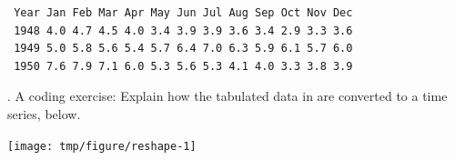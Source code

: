 \begin{frame}[fragile]
\vspace{-3mm}

\begin{knitrout}\small
{}\color{fgcolor}\begin{kframe}
\begin{verbatim}
 Year Jan Feb Mar Apr May Jun Jul Aug Sep Oct Nov Dec
 1948 4.0 4.7 4.5 4.0 3.4 3.9 3.9 3.6 3.4 2.9 3.3 3.6
 1949 5.0 5.8 5.6 5.4 5.7 6.4 7.0 6.3 5.9 6.1 5.7 6.0
 1950 7.6 7.9 7.1 6.0 5.3 5.6 5.3 4.1 4.0 3.3 3.8 3.9
\end{verbatim}
\end{kframe}
\end{knitrout}

\end{frame}

\begin{frame}[fragile]

\vspace{-2mm}

\myquestion. A coding exercise: Explain how the tabulated data in  are converted to a time series, below.



\begin{knitrout}\small
{}\color{fgcolor}\begin{kframe}
\begin{alltt}
 \hlkwb{<-} \hlstd{(}\hlstd{(U1[}\hlopt{:}\hlstd{]))}
 \hlkwb{<-} 
 \hlkwb{<-} \hlstd{(}\hlstd{=}\hlstd{,}\hlstd{=}\hlstd{=}\hlopt{/}\hlstd{)}
\hlstd{=}\hlstd{,}\hlstd{=}\hlstd{)}
\end{alltt}
\end{kframe}
\end{knitrout}

\vspace{-3mm}

\begin{knitrout}\small
{}\color{fgcolor}

{\centering \texttt{[image: tmp/figure/reshape-1]} 

}


\end{knitrout}


\end{frame}



